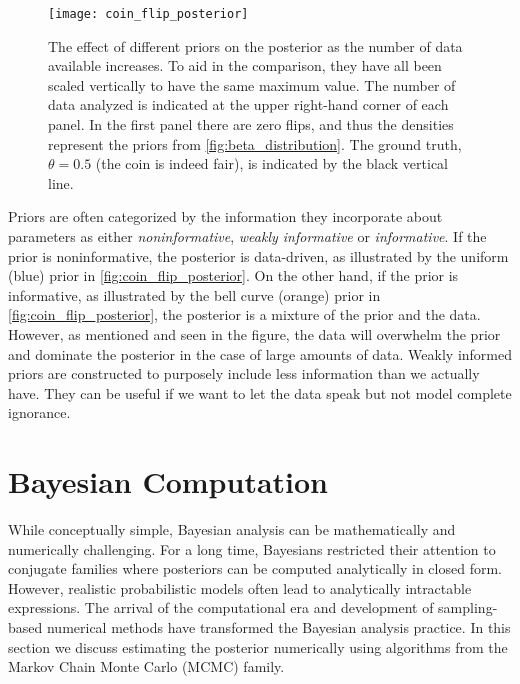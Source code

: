 \begin{figure}[!htb]
    \centering
    \texttt{[image: coin\_flip\_posterior]}
    \caption{The effect of different priors on the posterior as the number of data available increases. To aid in the comparison, they have all been scaled vertically to have the same maximum value. The number of data analyzed is indicated at the upper right-hand corner of each panel. In the first panel there are zero flips, and thus the densities represent the priors from \autoref{fig:beta_distribution}. The ground truth, $\theta=0.5$ (the coin is indeed fair), is indicated by the black vertical line. 
    }
    \label{fig:coin_flip_posterior}
\end{figure} 

Priors are often categorized by the information they incorporate about parameters as either \textit{noninformative}, \textit{weakly informative} or \textit{informative}. If the prior is noninformative, the posterior is data-driven, as illustrated by the uniform (blue) prior in \autoref{fig:coin_flip_posterior}. On the other hand, if the prior is informative, as illustrated by the bell curve (orange) prior in \autoref{fig:coin_flip_posterior}, the posterior is a mixture of the prior and the data. However, as mentioned and seen in the figure, the data will overwhelm the prior and dominate the posterior in the case of large amounts of data. Weakly informed priors are constructed to purposely include less information than we actually have. They can be useful if we want to let the data speak but not model complete ignorance.



\section{Bayesian Computation}\label{sec:bayesian_computation}

While conceptually simple, Bayesian analysis can be mathematically and numerically challenging. For a long time, Bayesians restricted their attention to conjugate families where posteriors can be computed analytically in closed form. However, realistic probabilistic models often lead to analytically intractable expressions. The arrival of the computational era and development of sampling-based numerical methods have transformed the Bayesian analysis practice. In this section we discuss estimating the posterior numerically using algorithms from the Markov Chain Monte Carlo (MCMC) family. 


